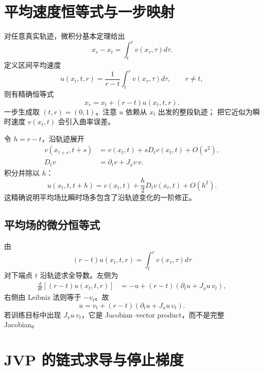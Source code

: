 \documentclass[11pt]{article}
\numberwithin{equation}{section}
\newcommand{\1}{\mathbf{1}}
\begin{document}
\section{平均速度恒等式与一步映射}

对任意真实轨迹，微积分基本定理给出
\begin{equation}
 x_r-x_t=\int_t^r v(x_\tau,\tau)d\tau.
\end{equation}
定义区间平均速度
\begin{equation}
 u(x_t,t,r)=\frac1{r-t}\int_t^r v(x_\tau,\tau)d\tau,
 \qquad r\ne t,
\end{equation}
则有精确恒等式
\begin{equation}
 \boxed{x_r=x_t+(r-t)u(x_t,t,r).}
\end{equation}
一步生成取 $(t,r)=(0,1)$。注意 $u$ 依赖从 $x_t$ 出发的整段轨迹；
把它近似为瞬时速度 $v(x_t,t)$ 会引入曲率误差。

令 $h=r-t$，沿轨迹展开
\begin{align}
 v(x_{t+s},t+s)
 &=v(x_t,t)+sD_tv(x_t,t)+O(s^2),\\
 D_tv&=\partial_tv+J_xv\,v.
\end{align}
积分并除以 $h$：
\begin{equation}
 u(x_t,t,t+h)=v(x_t,t)+\frac h2D_tv(x_t,t)+O(h^2).
\end{equation}
这精确说明平均场比瞬时场多包含了沿轨迹变化的一阶修正。

\subsection{平均场的微分恒等式}

由
\begin{equation}
 (r-t)u(x_t,t,r)=\int_t^rv(x_\tau,\tau)d\tau
\end{equation}
对下端点 $t$ 沿轨迹求全导数。左侧为
\begin{align}
 \frac{d}{dt}[(r-t)u(x_t,t,r)]
 &=-u+(r-t)(\partial_tu+J_xu\,v_t),
\end{align}
右侧由 Leibniz 法则等于 $-v_t$。故
\begin{equation}
 \boxed{u=v_t+(r-t)(\partial_tu+J_xu\,v_t).}
\end{equation}
若训练目标中出现 $J_xu\,v_t$，它是 Jacobian--vector product，而不是完整 Jacobian。

\section{JVP 的链式求导与停止梯度}
\end{document}

